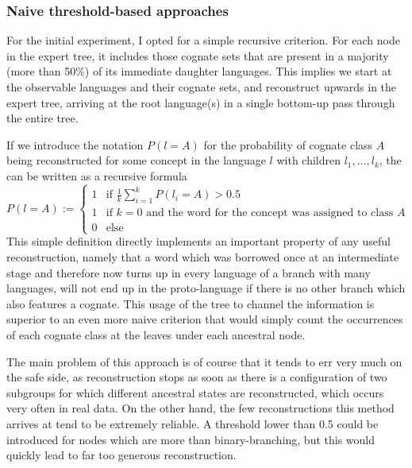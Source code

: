 \subsubsection{Naive threshold-based approaches}
For the initial experiment, I opted for a simple recursive criterion. For each node in the expert tree, it includes those cognate sets that are present in a majority (more than 50\%) of its immediate daughter languages. This implies we start at the observable languages and their cognate sets, and reconstruct upwards in the expert tree, arriving at the root language(s) in a single bottom-up pass through the entire tree.

If we introduce the notation $P(l = A)$ for the probability of cognate class $A$ being reconstructed for some concept in the language $l$ with children $l_1,\dots,l_k$, the  can be written as a recursive formula
\begin{equation}
   P(l = A) :=
   \begin{cases}
     1 & \text{if } \frac{1}{k} \sum_{i=1}^k P(l_i = A) > 0.5\\
     1 & \text{if } k = 0 \text{ and the word for the concept was assigned to class } A\\
     0 & \text{else }
   \end{cases}
\end{equation}
\linebreak
This simple definition directly implements an important property of any useful reconstruction, namely that a word which was borrowed once at an intermediate stage and therefore now turns up in every language of a branch with many languages, will not end up in the proto-language if there is no other branch which also features a cognate. This usage of the tree to channel the information is superior to an even more naive criterion that would simply count the occurrences of each cognate class at the leaves under each ancestral node.

The main problem of this approach is of course that it tends to err very much on the safe side, as reconstruction stops as soon as there is a configuration of two subgroups for which different ancestral states are reconstructed, which occurs very often in real data. On the other hand, the few reconstructions this method arrives at tend to be extremely reliable. A threshold lower than 0.5 could be introduced for nodes which are more than binary-branching, but this would quickly lead to far too generous reconstruction.

